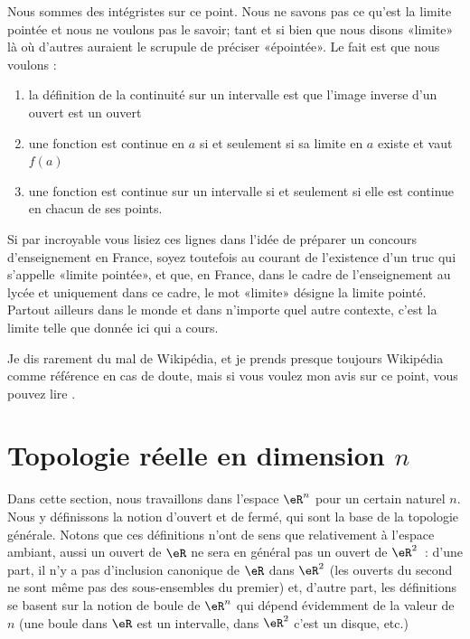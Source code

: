 Nous sommes des intégristes sur ce point. Nous ne savons pas ce qu'est la limite pointée et nous ne voulons pas le savoir; tant et si bien que nous disons «limite» là où d'autres auraient le scrupule de préciser «épointée». Le fait est que nous voulons :
\begin{enumerate}
    \item
        la définition de la continuité sur un intervalle est que l'image inverse d'un ouvert est un ouvert
    \item
        une fonction est continue en \( a\) si et seulement si sa limite en \( a\) existe et vaut \( f(a)\)
    \item
        une fonction est continue sur un intervalle si et seulement si elle est continue en chacun de ses points.
\end{enumerate}
Si par incroyable vous lisiez ces lignes dans l'idée de préparer un concours d'enseignement en France, soyez toutefois au courant de l'existence d'un truc qui s'appelle «limite pointée», et que, en France, dans le cadre de l'enseignement au lycée et uniquement dans ce cadre, le mot «limite» désigne la limite pointé. Partout ailleurs dans le monde et dans n'importe quel autre contexte, c'est la limite telle que donnée ici qui a cours.

Je dis rarement du mal de Wikipédia, et je prends presque toujours Wikipédia comme référence en cas de doute, mais si vous voulez mon avis sur ce point, vous pouvez lire \cite{ooEJTBooFehGbZ}.


\section{Topologie réelle en dimension $n$}

Dans cette section, nous travaillons dans l'espace $\eR^n$ pour un certain naturel $n$. Nous y définissons la notion d'ouvert et de fermé, qui sont la base de la topologie générale. Notons que ces définitions n'ont de sens que relativement à l'espace ambiant, aussi un ouvert de $\eR$ ne sera en général pas un ouvert de $\eR^2$~: d'une part, il n'y a pas d'inclusion canonique de $\eR$ dans $\eR^2$ (les ouverts du second ne sont même pas des sous-ensembles du premier) et, d'autre part, les définitions se basent sur la notion de boule de $\eR^n$ qui dépend évidemment de la valeur de $n$ (une boule dans $\eR$ est un intervalle, dans $\eR^2$ c'est un disque, etc.)

